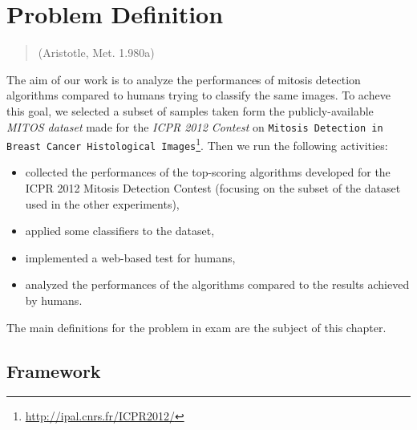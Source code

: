 \chapter{Problem Definition}
\label{chapter3}
\thispagestyle{empty}

\begin{quotation}
{\footnotesize
{}
\begin{flushright}
 (Aristotle, Met. 1.980a)
\end{flushright}
}
\end{quotation}

\vspace{2cm}
The aim of our work is to analyze the performances of mitosis detection algorithms compared to humans trying to classify the same images.
To acheve this goal, we selected a subset of samples taken form the publicly-available \textit{MITOS dataset} made for the \textit{ICPR 2012 Contest} on
\texttt{Mitosis Detection in Breast Cancer Histological Images}\footnote{\url{http://ipal.cnrs.fr/ICPR2012/}}.
Then we run the following activities:

\begin{itemize}
 \item collected the performances of the top-scoring algorithms developed for the ICPR 2012 Mitosis Detection Contest (focusing on the subset of the dataset
 used in the other experiments),
 \item applied some classifiers to the dataset,
 \item implemented a web-based test for humans,
 \item analyzed the performances of the algorithms compared to the results achieved by humans.
\end{itemize}

The main definitions for the problem in exam are the subject of this chapter.

\vspace{0.5cm}

\section{Framework}


